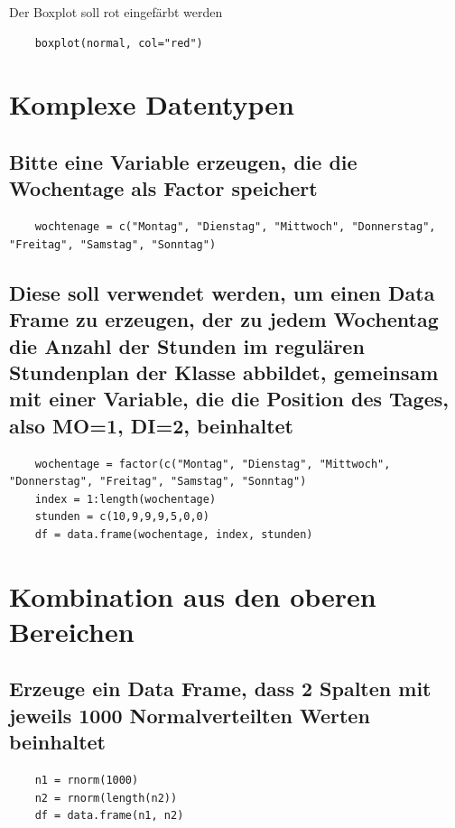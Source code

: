 \documentclass{article}
\begin{document}
Der Boxplot soll rot eingefärbt werden
\begin{lstlisting}
	boxplot(normal, col="red")
\end{lstlisting}


\section{Komplexe Datentypen}

\subsection{Bitte eine Variable erzeugen, die die Wochentage als Factor speichert}
\begin{lstlisting}
	wochtenage = c("Montag", "Dienstag", "Mittwoch", "Donnerstag", "Freitag", "Samstag", "Sonntag")
\end{lstlisting}

\subsection{Diese soll verwendet werden, um einen Data Frame zu erzeugen, der zu jedem Wochentag die Anzahl der Stunden im regulären Stundenplan der Klasse abbildet, gemeinsam mit einer Variable, die die Position des Tages, also MO=1, DI=2, beinhaltet}
\begin{lstlisting}
	wochentage = factor(c("Montag", "Dienstag", "Mittwoch", "Donnerstag", "Freitag", "Samstag", "Sonntag")
	index = 1:length(wochentage)
	stunden = c(10,9,9,9,5,0,0)
	df = data.frame(wochentage, index, stunden)
\end{lstlisting}


\section{Kombination aus den oberen Bereichen}

\subsection{Erzeuge ein Data Frame, dass 2 Spalten mit jeweils 1000 Normalverteilten Werten beinhaltet}
\begin{lstlisting}
	n1 = rnorm(1000)
	n2 = rnorm(length(n2))
	df = data.frame(n1, n2)
\end{lstlisting}
\end{document}
